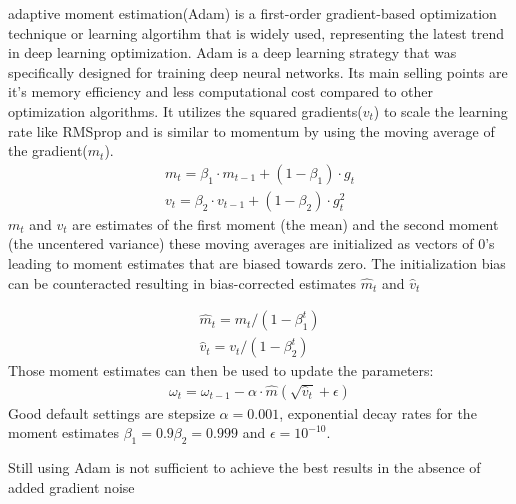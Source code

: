 \documentclass[
a4paper, 
12pt,
grayscalebody, %
abstract=on,
twoside, BCOR10mm, 12pt, DIV13,headinclude, footexclude, final, abstracton, openright
]{ibireprt}
\numberwithin{equation}{chapter}
\numberwithin{table}{chapter}
\numberwithin{figure}{chapter}
\numberwithin{algorithm}{chapter}
\numberwithin{example}{chapter}
\numberwithin{example}{chapter}
\begin{document}
adaptive moment estimation(Adam)\cite{Kingma2014} is a first-order gradient-based optimization technique or learning algortihm that is widely used, representing the latest trend in deep learning optimization. Adam is a deep learning strategy that was specifically designed for training deep neural networks. Its main selling points are it's memory efficiency and less computational cost compared to other optimization algorithms. It  utilizes the squared gradients($v_t$) to scale the learning rate like RMSprop and  is similar to momentum by using the moving average of the gradient($m_t$).%
\begin{align}
	m_t =\beta_1\cdot m_{t-1} + (1- \beta_1)\cdot g_t \\
	v_t =\beta_2\cdot v_{t-1} + (1- \beta_2)\cdot g_t^2
\end{align}
$m_t$ and $v_t$ are estimates of the first moment (the mean) and the second moment (the uncentered
variance) these moving averages are initialized as vectors of 0's leading to moment estimates that are  biased towards zero. The initialization bias can be counteracted resulting in bias-corrected estimates $\hat{m}_t$ and $\hat{v}_t$

\begin{align}
		\hat{m}_t = m_t/(1- \beta_1^t)\\
	\hat{v}_t = v_t/(1- \beta_2^t)
\end{align}
Those moment estimates can then be used to update the parameters: 
\begin{align}
	\omega_t = \omega_{t-1}-\alpha\cdot\hat{m}(\sqrt{\hat{v}_t}+\epsilon)
\end{align}
Good default settings are stepsize $\alpha = 0.001$, exponential decay rates for the moment estimates $\beta_1 = 0.9 \beta_2 = 0.999 $ and $\epsilon =  10^{-10}$.



Still using Adam is not sufficient to achieve the best results in the absence of added gradient noise \cite{Neelakantan2015}%


\end{document}
